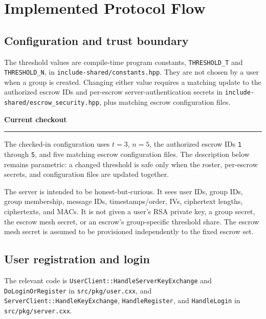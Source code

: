 \documentclass[11pt,a4paper]{article}
\newenvironment{infobox}[1][]
  {\begin{center}\begin{minipage}{0.88\textwidth}\noindent\textbf{#1}\par\smallskip\hrule\smallskip}
  {\end{minipage}\end{center}}
\begin{document}
\section{Implemented Protocol Flow}
\label{sec:flow}

\subsection{Configuration and trust boundary}

The threshold values are compile-time program constants, \texttt{THRESHOLD\_T} and \texttt{THRESHOLD\_N}, in \texttt{include-shared/constants.hpp}. They are not chosen by a user when a group is created. Changing either value requires a matching update to the authorized escrow IDs and per-escrow server-authentication secrets in \texttt{include-shared/escrow\_security.hpp}, plus matching escrow configuration files.

\begin{infobox}[Current checkout]
The checked-in configuration uses $t=3$, $n=5$, the authorized escrow IDs \texttt{1} through \texttt{5}, and five matching escrow configuration files. The description below remains parametric: a changed threshold is safe only when the roster, per-escrow secrets, and configuration files are updated together.
\end{infobox}

The server is intended to be honest-but-curious. It sees user IDs, group IDs, group membership, message IDs, timestamps/order, IVs, ciphertext lengths, ciphertexts, and MACs. It is not given a user's RSA private key, a group secret, the escrow mesh secret, or an escrow's group-specific threshold share. The escrow mesh secret is assumed to be provisioned independently to the fixed escrow set.

\subsection{User registration and login}

The relevant code is \texttt{UserClient::HandleServerKeyExchange} and \texttt{DoLoginOrRegister} in \texttt{src/pkg/user.cxx}, and \texttt{ServerClient::HandleKeyExchange}, \texttt{HandleRegister}, and \texttt{HandleLogin} in \texttt{src/pkg/server.cxx}.
\end{document}
